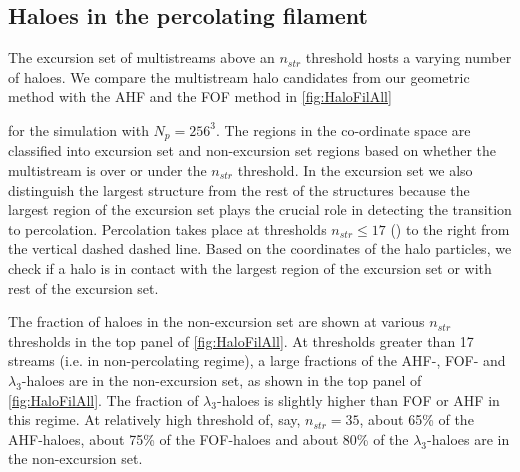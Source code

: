\subsection{Haloes in the percolating filament} 

The excursion set of multistreams above an $n_{str}$ threshold hosts a varying number of haloes. We compare the multistream halo candidates from our geometric method with the AHF and the FOF method in \autoref{fig:HaloFilAll} 

for the simulation with $N_p = 256^3$. The regions in the co-ordinate space are classified into excursion set and non-excursion set regions based on whether the multistream is over or under the $n_{str}$ threshold. In the excursion set we also distinguish the largest structure from  the rest of the structures because the largest region of the excursion set plays the crucial role  in detecting the  transition to percolation. Percolation takes place at thresholds $n_{str} \le 17$ (\citealt{Ramachandra2017}) to the right from  the vertical dashed dashed line. Based on the coordinates of the halo particles, we check if a halo is in contact with the largest region of the excursion set or with rest of the excursion set. 


The fraction of haloes in the non-excursion set are shown at various $n_{str}$ thresholds in the top panel of \autoref{fig:HaloFilAll}. At thresholds greater than 17 streams (i.e. in non-percolating regime), a large fractions of the AHF-, FOF- and $\lambda_3$-haloes are in the non-excursion set, as shown in the top panel of \autoref{fig:HaloFilAll}. The fraction of $\lambda_3$-haloes is slightly higher than FOF or AHF in this regime. At relatively high threshold of, say, $n_{str} = 35$, about 65\% of the AHF-haloes, about 75\% of the FOF-haloes and about 80\% of the $\lambda_3$-haloes are in the non-excursion set.  



